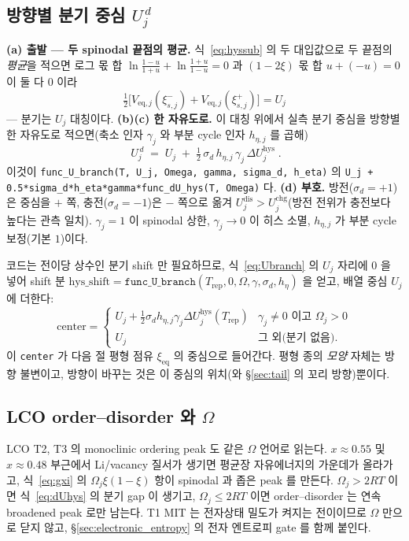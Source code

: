 \documentclass[11pt,a4paper]{article}
\newcommand{\eq}{\mathrm{eq}}
\newcommand{\dis}{\mathrm{dis}}
\newcommand{\chg}{\mathrm{chg}}
\newcommand{\hys}{\mathrm{hys}}
\newcommand{\rep}{\mathrm{rep}}
\newcommand{\code}[1]{\texttt{#1}}
\begin{document}
\subsection{방향별 분기 중심 $U_j^{\,d}$}
\textbf{(a) 출발 — 두 spinodal 끝점의 평균.} 식~\eqref{eq:hyssub} 의 두 대입값으로 두 끝점의 \emph{평균}을 적으면
로그 몫 합 $\ln\frac{1-u}{1+u}+\ln\frac{1+u}{1-u}=0$ 과 $(1-2\xi)$ 몫 합 $u+(-u)=0$ 이 둘 다 $0$ 이라
\begin{equation}
\tfrac12\big[V_{\eq,j}(\xi_{s,j}^-)+V_{\eq,j}(\xi_{s,j}^+)\big]=U_j
\label{eq:hyssym}
\end{equation}
— 분기는 $U_j$ 대칭이다. \textbf{(b)(c) 한 자유도로.} 이 대칭 위에서 실측 분기 중심을 방향별 한 자유도로 적으면(축소
인자 $\gamma_j$ 와 부분 cycle 인자 $h_{\eta,j}$ 를 곱해)
\begin{equation}
\boxed{\;U_j^{\,d}\;=\;U_j\;+\;\tfrac12\,\sigma_d\,h_{\eta,j}\,\gamma_j\,\Delta U_j^\hys\;.}
\label{eq:Ubranch}
\end{equation}
이것이 \code{func\_U\_branch(T, U\_j, Omega, gamma, sigma\_d, h\_eta)} 의
\code{U\_j + 0.5*sigma\_d*h\_eta*gamma*func\_dU\_hys(T, Omega)} 다. \textbf{(d) 부호.} 방전($\sigma_d=+1$)은 중심을
$+$ 쪽, 충전($\sigma_d=-1$)은 $-$ 쪽으로 옮겨 $U_j^{\dis}>U_j^{\chg}$(방전 전위가 충전보다 높다는 관측 일치).
$\gamma_j=1$ 이 spinodal 상한, $\gamma_j\to0$ 이 히스 소멸, $h_{\eta,j}$ 가 부분 cycle 보정(기본 $1$)이다.

코드는 전이당 상수인 분기 shift 만 필요하므로, 식~\eqref{eq:Ubranch} 의 $U_j$ 자리에 $0$ 을 넣어 shift 분
$\mathrm{hys\_shift}=\code{func\_U\_branch}(T_\rep,0,\Omega,\gamma,\sigma_d,h_\eta)$ 을 얻고, 배열 중심 $U_j$ 에 더한다:
\begin{equation}
\mathrm{center}=
\begin{cases}
U_j+\tfrac12\sigma_d h_{\eta,j}\gamma_j\Delta U_j^\hys(T_\rep) & \gamma_j\ne0 \text{ 이고 } \Omega_j>0\\[2pt]
U_j & \text{그 외(분기 없음)}.
\end{cases}
\label{eq:center}
\end{equation}
이 \code{center} 가 다음 절 평형 점유 $\xi_\eq$ 의 중심으로 들어간다. 평형 종의 \emph{모양} 자체는 방향 불변이고,
방향이 바꾸는 것은 이 중심의 위치(와 \S\ref{sec:tail} 의 꼬리 방향)뿐이다.

\subsection{LCO order--disorder 와 $\Omega$}
LCO T2, T3 의 monoclinic ordering peak 도 같은 $\Omega$ 언어로 읽는다. $x\approx0.55$ 및 $x\approx0.48$ 부근에서
Li/vacancy 질서가 생기면 평균장 자유에너지의 가운데가 올라가고, 식~\eqref{eq:gxi} 의 $\Omega_j\xi(1-\xi)$ 항이
spinodal 과 좁은 peak 를 만든다. $\Omega_j>2RT$ 이면 식~\eqref{eq:dUhys} 의 분기 gap 이 생기고,
$\Omega_j\le2RT$ 이면 order--disorder 는 연속 broadened peak 로만 남는다. T1 MIT 는 전자상태 밀도가 켜지는
전이이므로 $\Omega$ 만으로 닫지 않고, \S\ref{sec:electronic_entropy} 의 전자 엔트로피 gate 를 함께 붙인다.
\end{document}
